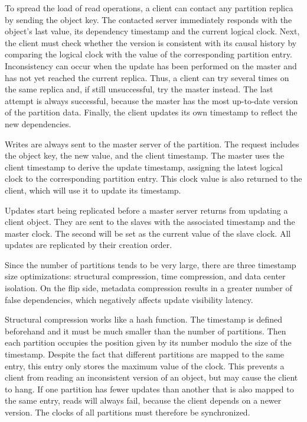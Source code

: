 To spread the load of read operations, a client can contact any partition replica by sending the object key. The contacted server immediately responds with the object's last value, its dependency timestamp and the current logical clock. Next, the client must check whether the version is consistent with its causal history by comparing the logical clock with the value of the corresponding partition entry. Inconsistency can occur when the update has been performed on the master and has not yet reached the current replica. Thus, a client can try several times on the same replica and, if still unsuccessful, try the master instead. The last attempt is always successful, because the master has the most up-to-date version of the partition data. Finally, the client updates its own timestamp to reflect the new dependencies. 

Writes are always sent to the master server of the partition. The request includes the object key, the new value, and the client timestamp. The master uses the client timestamp to derive the update timestamp, assigning the latest logical clock to the corresponding partition entry. This clock value is also returned to the client, which will use it to update its timestamp. 

Updates start being replicated before a master server returns from updating a client object. They are sent to the slaves with the associated timestamp and the master clock. The second will be set as the current value of the slave clock. All updates are replicated by their creation order. 

Since the number of partitions tends to be very large, there are three timestamp size optimizations: structural compression, time compression, and data center isolation. On the flip side, metadata compression results in a greater number of false dependencies, which negatively affects update visibility latency. 

Structural compression works like a hash function. The timestamp is defined beforehand and it must be much smaller than the number of partitions. Then each partition occupies the position given by its number modulo the size of the timestamp. Despite the fact that different partitions are mapped to the same entry, this entry only stores the maximum value of the clock. This prevents a client from reading an inconsistent version of an object, but may cause the client to hang. If one partition has fewer updates than another that is also mapped to the same entry, reads will always fail, because the client depends on a newer version. The clocks of all partitions must therefore be synchronized. 

